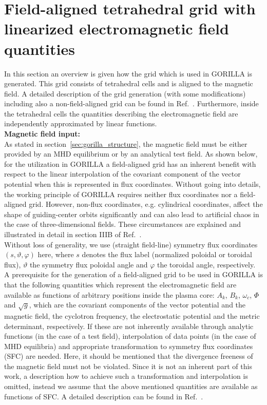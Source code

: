 \documentclass{TheMartianReport}
\begin{document}
\section{Field-aligned tetrahedral grid with linearized electromagnetic field \\ quantities}
\label{sec:tetrahedral_grid}
%
In this section an overview is given how the grid which is used in GORILLA is generated. This grid consists of tetrahedral cells and is aligned to the magnetic field.  A detailed description of the grid generation (with some modifications) including also a non-field-aligned grid can be found in Ref.~. 
Furthermore, inside the tetrahedral cells the quantities describing the electromagnetic field are independently approximated by linear functions.\\



\textbf{Magnetic field input:}\\
%
As stated in section~\ref{sec:gorilla_structure}, the magnetic field must be either provided by an MHD equilibrium or by an analytical test field. As shown below, for the utilization in GORILLA a field-aligned grid has an inherent benefit with respect to the linear interpolation of the covariant component of the vector potential when this is represented in flux coordinates. Without going into details, the working principle of GORILLA requires neither flux coordinates nor a field-aligned grid. However, non-flux coordinates, e.g. cylindrical coordinates, affect the shape of guiding-center orbits significantly and can also lead to artificial chaos in the case of three-dimensional fields. These circumstances are explained and illustrated in detail in section IIIB of Ref.~.\\
%
Without loss of generality, we use (straight field-line) symmetry flux coordinates\cite{dhaeseleer_flux_2012} $(s,\vartheta,\varphi)$ here, where $s$ denotes the flux label (normalized poloidal or toroidal flux), $\vartheta$ the symmetry flux poloidal angle and $\varphi$ the toroidal angle, respectively. A prerequisite for the generation of a field-aligned grid to be used in GORILLA is that the following quantities which represent the electromagnetic field are available as functions of arbitrary positions inside the plasma core: $A_k$, $B_k$, $\omega_c$, $\Phi$ and $\sqrt{g}$, which are the covariant components of the vector potential and the magnetic field, the cyclotron frequency, the electrostatic potential and the metric determinant, respectively. If these are not inherently available through analytic functions (in the case of a test field), interpolation of data points (in the case of MHD equilibria) and appropriate transformation to symmetry flux coordinates (SFC) are needed. Here, it should be mentioned that the divergence freeness of the magnetic field must not be violated. Since it is not an inherent part of this work, a description how to achieve such a transformation and interpolation is omitted, instead we assume that the above mentioned quantities are available as functions of SFC. A detailed description can be found in Ref.~.\\
\end{document}
